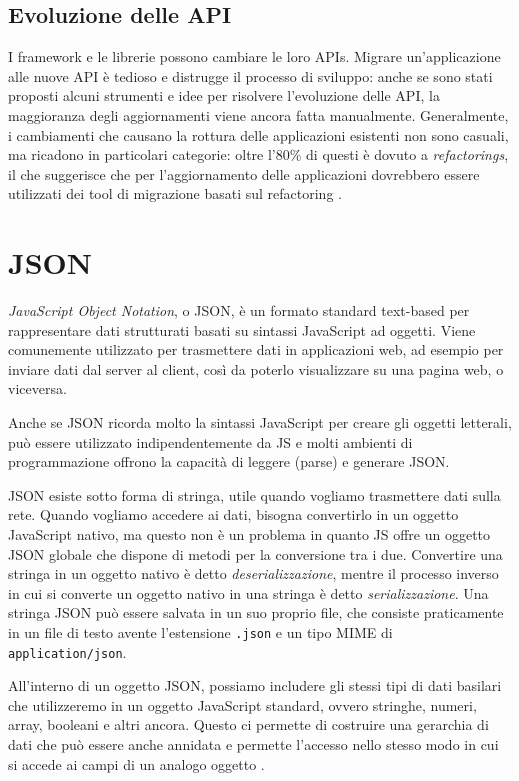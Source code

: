\subsection{Evoluzione delle API}
I framework e le librerie possono cambiare le loro APIs. Migrare un'applicazione alle nuove API è tedioso e distrugge il processo di sviluppo: anche se sono stati proposti alcuni strumenti e idee per risolvere l'evoluzione delle API, la maggioranza degli aggiornamenti viene ancora fatta manualmente. Generalmente, i cambiamenti che causano la rottura delle applicazioni esistenti non sono casuali, ma ricadono in particolari categorie: oltre l'80\% di questi è dovuto a \textit{refactorings}, il che suggerisce che per l'aggiornamento delle applicazioni dovrebbero essere utilizzati dei tool di migrazione basati sul refactoring \cite{API_Evolution}.

\section{JSON}
\textit{JavaScript Object Notation}, o JSON, è un formato standard text-based per rappresentare dati strutturati basati su sintassi JavaScript ad oggetti. Viene comunemente utilizzato per trasmettere dati in applicazioni web, ad esempio per inviare dati dal server al client, così da poterlo visualizzare su una pagina web, o viceversa.

Anche se JSON ricorda molto la sintassi JavaScript per creare gli oggetti letterali, può essere utilizzato indipendentemente da JS e molti ambienti di programmazione offrono la capacità di leggere (parse) e generare JSON.

JSON esiste sotto forma di stringa, utile quando vogliamo trasmettere dati sulla rete. Quando vogliamo accedere ai dati, bisogna convertirlo in un oggetto JavaScript nativo, ma questo non è un problema in quanto JS offre un oggetto JSON globale che dispone di metodi per la conversione tra i due. Convertire una stringa in un oggetto nativo è detto \textit{deserializzazione}, mentre il processo inverso in cui si converte un oggetto nativo in una stringa è detto \textit{serializzazione}. Una stringa JSON può essere salvata in un suo proprio file, che consiste praticamente in un file di testo avente l'estensione \Verb_.json_ e un tipo MIME di \Verb_application/json_.

All'interno di un oggetto JSON, possiamo includere gli stessi tipi di dati basilari che utilizzeremo in un oggetto JavaScript standard, ovvero stringhe, numeri, array, booleani e altri ancora. Questo ci permette di costruire una gerarchia di dati che può essere anche annidata e permette l'accesso nello stesso modo in cui si accede ai campi di un analogo oggetto \cite{JSON}.

